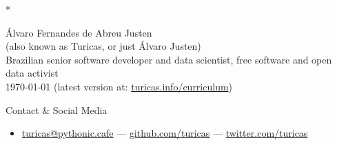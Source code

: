 \documentclass[a4paper,11pt]{article}
\begin{document}
\pagestyle{empty}

\begin{section}*{}
\begin{center}
	\huge{Álvaro Fernandes de Abreu Justen}
	\\
	\small{(also known as Turicas, or just Álvaro Justen)}
	\large{\\}
	Brazilian senior software developer and data scientist, free software and open data activist
	\large{\\}
	\large{\today} (\small{latest version at: \href{http://turicas.info/curriculum}{turicas.info/curriculum}})
\end{center}
\end{section}

\renewcommand{\labelitemi}{$\diamond$}
\renewcommand{\labelitemii}{$\rightarrow$}

\begin{section}{Contact \& Social Media}
	\begin{itemize}
		\renewcommand{\labelitemi}{}
		\item \url{turicas@pythonic.cafe} ---
			\url{github.com/turicas} ---
			\url{twitter.com/turicas}
	\end{itemize}
\end{section}
\end{document}
